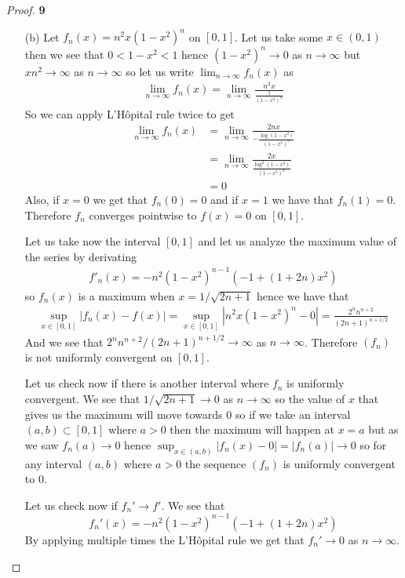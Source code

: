 \documentclass[11pt]{article}
\theoremstyle{definition}
\begin{document}
\begin{proof}{\textbf{9}}
\begin{itemize}
    \cleardoublepage
    \item [(b)] Let $f_n(x) = n^2x(1 - x^2)^n$ on $[0,1]$. Let us take some
    $x \in (0,1)$ then we see that $0 < 1 - x^2 < 1$ hence $(1 -x^2)^n \to 0$
    as $n \to \infty$ but $xn^2 \to \infty$ as $n \to \infty$ so let us write
    $\lim_{n \to \infty} f_n(x)$ as
    \begin{align*}
        \lim_{n\to\infty}f_n(x)
        = \lim_{n\to\infty} \frac{n^2x}{\frac{1}{(1 - x^2)^n}}
    \end{align*}
    So we can apply L'Hôpital rule twice to get
    \begin{align*}
        \lim_{n\to\infty}f_n(x)
        &= \lim_{n\to\infty} \frac{2nx}{-\frac{\log(1 - x^2)}{(1 - x^2)^{n}}}\\
        &= \lim_{n\to\infty} \frac{2x}{\frac{\log^2(1 - x^2)}{(1 - x^2)^{n}}}\\
        &= 0
    \end{align*}
    Also, if $x=0$ we get that $f_n(0) = 0$ and if $x=1$ we have that
    $f_n(1) = 0$. Therefore $f_n$ converges pointwise to $f(x) = 0$ on $[0,1]$.

    Let us take now the interval $[0,1]$ and let us analyze the maximum value
    of the series by derivating
    \begin{align*}
        f'_n(x) = -n^2 (1 - x^2)^{n-1} (-1 + (1 + 2 n) x^2)
    \end{align*}
    so $f_n(x)$ is a maximum when $x = 1/\sqrt{2n + 1}$ hence we have that
    \begin{align*}
        \sup_{x \in [0,1]}|f_n(x) - f(x)|
        = \sup_{x \in [0,1]}|n^2x(1 - x^2)^n - 0|
        = \frac{2^nn^{n+2}}{(2n + 1)^{n+1/2}}
    \end{align*}
    And we see that $2^nn^{n+2}/(2n + 1)^{n+1/2} \to \infty$ as
    $n \to \infty$.
    Therefore $(f_n)$ is not uniformly convergent on $[0,1]$.

    Let us check now if there is another interval where $f_n$ is uniformly
    convergent. We see that $1/\sqrt{2n + 1} \to 0$ as $n \to \infty$ so the
    value of $x$ that gives us the maximum will move towards $0$ so if we take
    an interval $(a,b) \subset [0,1]$ where $a> 0$ then the maximum will happen
    at $x=a$ but as we saw $f_n(a) \to 0$ hence
    $\sup_{x \in (a,b)} |f_n(x) - 0| = |f_n(a)|\to 0$ so for any interval
    $(a,b)$ where $a > 0$ the sequence $(f_n)$ is uniformly convergent to $0$.

    Let us check now if $f_n' \to f'$.
    We see that
    $$f_n'(x) = -n^2 (1 - x^2)^{n-1} (-1 + (1 + 2 n) x^2)$$
    By applying multiple times the L'Hôpital rule we get that $f_n' \to 0$ as
    $n \to \infty$.


\end{itemize}
\end{proof}
\end{document}
